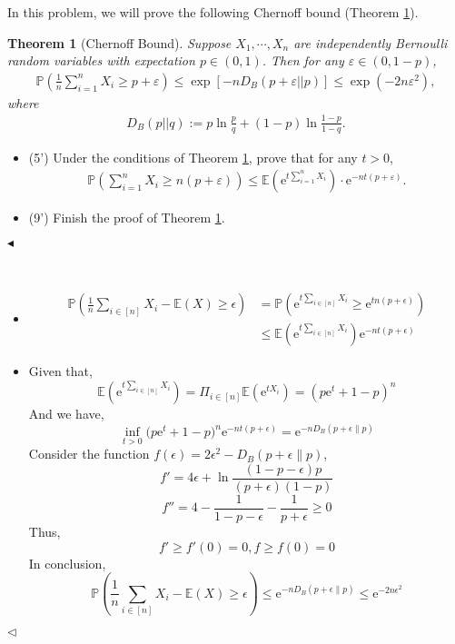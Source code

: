 \documentclass[11pt]{article}
\newtheorem{theorem}{Theorem}
\newenvironment{problem}[2][Problem]{\begin{trivlist}
\item[\hskip \labelsep {\bfseries #1}\hskip \labelsep {\bfseries #2.}]}{\hfill$\blacktriangleleft$\end{trivlist}}
\newenvironment{answer}[1][Answer]{\begin{trivlist}
\item[\hskip \labelsep {\bfseries #1.}\hskip \labelsep]}{\hfill$\lhd$\end{trivlist}}
\begin{document}
\begin{problem}{4 (14')}
In this problem, we will prove the following Chernoff bound (Theorem \ref*{thm:chernoff}).
\begin{theorem}[Chernoff Bound]
\label{thm:chernoff}
    Suppose $X_1,\cdots,X_n$ are independently Bernoulli random variables with expectation $p\in(0,1)$. Then for any $\varepsilon\in(0,1-p)$,
    \begin{align*}
        \mathbb{P}\left(\frac{1}{n}\sum_{i=1}^n X_i\geq p+\varepsilon\right)\leq \exp\left[-nD_B(p+\varepsilon||p)\right] \leq \exp(-2n\varepsilon^2),
    \end{align*} 
where 
\begin{align*}
    D_B(p||q):=p\ln\frac{p}{q}+(1-p)\ln\frac{1-p}{1-q}.
\end{align*}
\end{theorem}
\begin{itemize}
    \item [(1)] (5') Under the conditions of Theorem \ref*{thm:chernoff}, prove that for any $t>0$,
    \begin{align*}
        \mathbb{P}\left(\sum_{i=1}^n X_i\geq n(p+\varepsilon)\right)\leq\mathbb{E}\left(\mathrm{e}^{t\sum_{i=1}^n X_i}\right)\cdot\mathrm{e}^{-nt(p+\varepsilon)}.
    \end{align*}
    \item [(2)] (9') Finish the proof of Theorem \ref*{thm:chernoff}.
\end{itemize}
\end{problem}

\begin{answer} ~
\begin{itemize}
    \item [(1)] 
$$\begin{align*}\mathbb P\left(\frac{1}{n}\sum_{i\in [n]} X_i-\mathbb E(X) \ge \epsilon\right)&=\mathbb P(\mathrm e^{t\sum_{i\in [n]} X_i}\ge \mathrm e^{tn(p+\epsilon)})\\
&\leq \mathbb E(\mathrm e^{t\sum_{i\in [n]} X_i})\mathrm e^{-nt(p+\epsilon)}\end{align*}$$
    \item [(2)] 
Given that,
$$\mathbb E(\mathrm e^{t\sum_{i\in [n]} X_i})=\Pi_{i\in [n]}\mathbb E(\mathrm e^{tX_i})=(p\mathrm e^t+1-p)^n$$
And we have,
$$\inf_{t>0} \mathbb (p\mathrm e^t+1-p)^n\mathrm e^{-nt(p+\epsilon)}=\mathrm e^{-nD_B(p+\epsilon\|p)}$$
Consider the function $f(\epsilon)=2\epsilon^2-D_B(p+\epsilon\|p)$,
$$f'=4\epsilon+\ln \frac{(1-p-\epsilon)p}{(p+\epsilon)(1-p)}$$
$$f''=4-\frac{1}{1-p-\epsilon}-\frac{1}{p+\epsilon}\ge 0$$
Thus,
$$f'\ge f'(0)=0,f\ge f(0)=0$$
In conclusion,
$$\mathbb P\left(\frac{1}{n}\sum_{i\in [n]} X_i-\mathbb E(X) \ge \epsilon\right) \leq \mathrm e^{-nD_B(p+\epsilon\|p)}\leq \mathrm e^{-2n\epsilon^2}$$
\end{itemize}
\end{answer}
\end{document}
